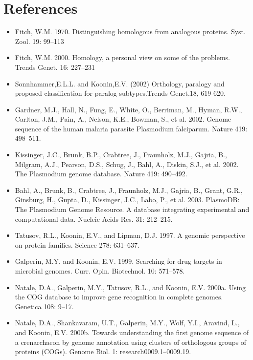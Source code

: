 \documentclass{article}
\begin{document}
	\section*{References}
		\begin{itemize}
			\item Fitch, W.M. 1970. Distinguishing homologous from analogous proteins. Syst. Zool. 19: 99–113
			
			\item Fitch, W.M. 2000. Homology, a personal view on some of the problems. Trends Genet. 16: 227–231
			
			\item Sonnhammer,E.L.L. and Koonin,E.V. (2002) Orthology, paralogy and proposed classification for paralog subtypes.Trends Genet.18, 619-620.
			
			\item Gardner, M.J., Hall, N., Fung, E., White, O., Berriman, M., Hyman, R.W., Carlton, J.M., Pain, A., Nelson, K.E., Bowman, S., et al. 2002. Genome sequence of the human malaria parasite Plasmodium falciparum. Nature 419: 498–511.
			
			\item Kissinger, J.C., Brunk, B.P., Crabtree, J., Fraunholz, M.J., Gajria, B., Milgram, A.J., Pearson, D.S., Schug, J., Bahl, A., Diskin, S.J., et al. 2002. The Plasmodium genome database. Nature 419: 490–492.
			
			\item Bahl, A., Brunk, B., Crabtree, J., Fraunholz, M.J., Gajria, B., Grant, G.R., Ginsburg, H., Gupta, D., Kissinger, J.C., Labo, P., et al. 2003. PlasmoDB: The Plasmodium Genome Resource. A database integrating experimental and computational data. Nucleic Acids Res. 31: 212–215.
			
			\item Tatusov, R.L., Koonin, E.V., and Lipman, D.J. 1997. A genomic perspective on protein families. Science 278: 631–637.
			
			\item Galperin, M.Y. and Koonin, E.V. 1999. Searching for drug targets in microbial genomes. Curr. Opin. Biotechnol. 10: 571–578.
			
			\item Natale, D.A., Galperin, M.Y., Tatusov, R.L., and Koonin, E.V. 2000a. Using the COG database to improve gene recognition in complete genomes. Genetica 108: 9–17.
			
			\item Natale, D.A., Shankavaram, U.T., Galperin, M.Y., Wolf, Y.I., Aravind, L., and Koonin, E.V. 2000b. Towards understanding the first genome sequence of a crenarchaeon by genome annotation using clusters of orthologous groups of proteins (COGs). Genome Biol. 1: research0009.1–0009.19.
			

\end{itemize}
\end{document}
